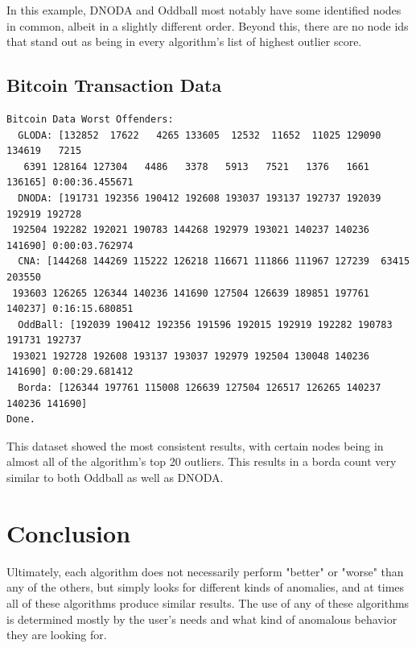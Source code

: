 \documentclass[10pt,letterpaper]{article}
\begin{document}
In this example, DNODA and Oddball most notably have some identified nodes in common,
albeit in a slightly different order. Beyond this, there are no node ids that
stand out as being in every algorithm's list of highest outlier score.

\subsection{Bitcoin Transaction Data}

\begin{verbatim}
Bitcoin Data Worst Offenders:
  GLODA: [132852  17622   4265 133605  12532  11652  11025 129090 134619   7215
   6391 128164 127304   4486   3378   5913   7521   1376   1661 136165] 0:00:36.455671
  DNODA: [191731 192356 190412 192608 193037 193137 192737 192039 192919 192728
 192504 192282 192021 190783 144268 192979 193021 140237 140236 141690] 0:00:03.762974
  CNA: [144268 144269 115222 126218 116671 111866 111967 127239  63415 203550
 193603 126265 126344 140236 141690 127504 126639 189851 197761 140237] 0:16:15.680851
  OddBall: [192039 190412 192356 191596 192015 192919 192282 190783 191731 192737
 193021 192728 192608 193137 193037 192979 192504 130048 140236 141690] 0:00:29.681412
  Borda: [126344 197761 115008 126639 127504 126517 126265 140237 140236 141690]
Done.
\end{verbatim}

This dataset showed the most consistent results, with certain nodes being in almost
all of the algorithm's top 20 outliers. This results in a borda count very similar
to both Oddball as well as DNODA.

\section{Conclusion}

Ultimately, each algorithm does not necessarily perform "better" or "worse" than any of 
the others, but simply looks for different kinds of anomalies, and at times all
of these algorithms produce similar results. The use of any of these
algorithms is determined mostly by the user's needs and what kind of anomalous
behavior they are looking for.

{}

\end{document}
